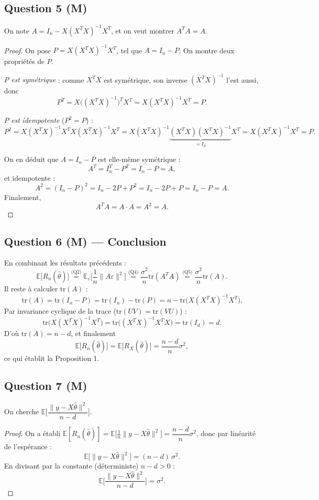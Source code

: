 \documentclass[11pt]{article}
\theoremstyle{remark}
\newcommand{\E}{\mathbb{E}}
\newcommand{\tr}{\mathrm{tr}}
\begin{document}
\subsection*{Question 5 (M)}

On note $A = I_n - X(X^TX)^{-1}X^T$, et on veut montrer $A^TA = A$.

\begin{proof}
On pose $P = X(X^TX)^{-1}X^T$, tel que $A = I_n - P$. On montre deux propriétés de $P$.

\emph{$P$ est symétrique} : comme $X^TX$ est symétrique, son inverse $(X^TX)^{-1}$ l'est aussi, donc
\[
  P^T = X\big((X^TX)^{-1}\big)^TX^T = X(X^TX)^{-1}X^T = P.
\]

\emph{$P$ est idempotente} ($P^2=P$) :
\[
  P^2 = X(X^TX)^{-1}X^TX(X^TX)^{-1}X^T = X(X^TX)^{-1}\underbrace{(X^TX)(X^TX)^{-1}}_{=I_d}X^T = X(X^TX)^{-1}X^T = P.
\]

On en déduit que $A=I_n-P$ est elle-même symétrique :
\[
  A^T = I_n^T - P^T = I_n - P = A,
\]
et idempotente :
\[
  A^2 = (I_n-P)^2 = I_n - 2P + P^2 = I_n - 2P + P = I_n - P = A.
\]
Finalement,
\[
  A^TA = A \cdot A = A^2 = A.
\]
\end{proof}

\subsection*{Question 6 (M) --- Conclusion}

En combinant les résultats précédents :
\[
  \E\big[R_n(\hat\theta)\big] \overset{\text{(Q2)}}{=} \E_\varepsilon\Big[\frac1n\|A\varepsilon\|^2\Big] \overset{\text{(Q4)}}{=} \frac{\sigma^2}{n}\tr(A^TA) \overset{\text{(Q5)}}{=} \frac{\sigma^2}{n}\tr(A).
\]
Il reste à calculer $\tr(A)$ :
\[
  \tr(A) = \tr(I_n - P) = \tr(I_n) - \tr(P) = n - \tr\big(X(X^TX)^{-1}X^T\big).
\]
Par invariance cyclique de la trace ($\tr(UV)=\tr(VU)$) :
\[
  \tr\big(X(X^TX)^{-1}X^T\big) = \tr\big((X^TX)^{-1}X^TX\big) = \tr(I_d) = d.
\]
D'où $\tr(A) = n-d$, et finalement
\[
  \boxed{\E\big[R_n(\hat\theta)\big] = \E\big[R_X(\hat\theta)\big] = \frac{n-d}{n}\sigma^2},
\]
ce qui établit la Proposition 1.

\subsection*{Question 7 (M)}

On cherche $\E\Big[\dfrac{\|y-X\hat\theta\|^2}{n-d}\Big]$.

\begin{proof}
On a établi $\E[R_n(\hat\theta)] = \E\big[\tfrac1n\|y-X\hat\theta\|^2\big] = \dfrac{n-d}{n}\sigma^2$, donc par linéarité de l'espérance :
\[
  \E\big[\|y-X\hat\theta\|^2\big] = (n-d)\,\sigma^2.
\]
En divisant par la constante (déterministe) $n-d > 0$ :
\[
  \boxed{\E\Big[\frac{\|y-X\hat\theta\|^2}{n-d}\Big] = \sigma^2}.
\]
\end{proof}
\end{document}
